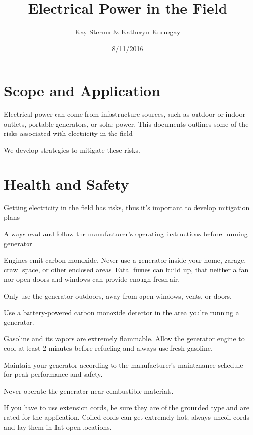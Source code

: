 \documentclass[12pt]{../SOP3_beta}
\title{Electrical Power in the Field}
\date{8/11/2016}
\author{Kay Sterner \& Katheryn Kornegay}
\begin{document}


\maketitle

\section{Scope and Application}

\NP Electrical power can come from infastructure sources, such as outdoor or indoor outlets, portable generators, or solar power.
\NP This documents outlines some of the risks associated with electricity in the field

\NP We develop strategies to mitigate these risks.

\section{Health and Safety}

\NP Getting electricity in the field has risks, thus it's important to develop mitigation plans

\NP Always read and follow the manufacturer's operating instructions before running
generator

\NP Engines emit carbon monoxide. Never use a generator inside your home, garage, crawl space, or other enclosed areas. Fatal fumes can build up, that neither a fan nor open doors and windows can provide enough fresh air.

\NP Only use the generator outdoors, away from open windows, vents, or doors.

\NP Use a battery-powered carbon monoxide detector in the area you're running a generator.

\NP Gasoline and its vapors are extremely flammable. Allow the generator engine to cool at least 2 minutes before refueling and always use fresh gasoline. 

\NP Maintain your generator according to the manufacturer’s maintenance schedule for peak performance and safety.

\NP Never operate the generator near combustible materials.

\NP If you have to use extension cords, be sure they are of the grounded type and are rated for the application. Coiled cords can get extremely hot; always uncoil cords and lay them in flat open locations.
\end{document}
